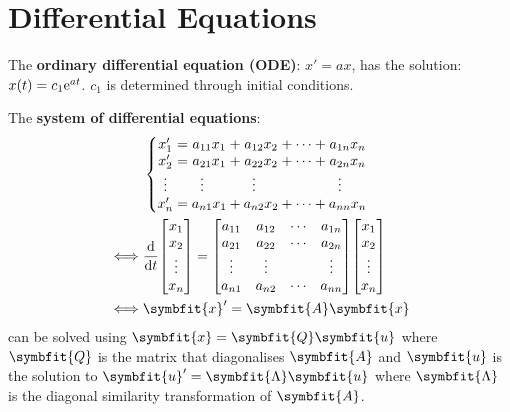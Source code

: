 \documentclass{article}
\begin{document}
\section*{Differential Equations}
The \textbf{ordinary differential equation (ODE)}: $x' = a x$,
has the solution: $x(t) = c_1 \mathrm{e}^{a t}$. $c_1$ is determined through
initial conditions.
\begin{multicols*}{2}
    The \textbf{system of differential equations}:
    \begin{align*}
               & \left\{
        \setlength\arraycolsep{0pt}
        \begin{array}{ c >{{}}c<{{}} c >{{}}c<{{}} c >{{}}c<{{}} c >{{}}c<{{}} c  }
            x'_1               & = & a_{11}x_1                         & + & a_{12}x_2                         & + & \cdots & + & a_{1n}x_n                         \\
            x'_2               & = & a_{21}x_1                         & + & a_{22}x_2                         & + & \cdots & + & a_{2n}x_n                         \\
            \vdotswithin{x'_3} &   & \vdotswithin{a_{31}}\phantom{x_1} &   & \vdotswithin{a_{32}}\phantom{x_2} &   &        &   & \vdotswithin{a_{3n}}\phantom{x_n} \\
            x'_n               & = & a_{n1}x_1                         & + & a_{n2}x_2                         & + & \cdots & + & a_{nn}x_n
        \end{array}
        \right.                                                           \\
        \iff
               & \dv{t}\mqty[x_1                                          \\ x_2 \\ \vdots \\ x_n] = \mqty[
        a_{11} & a_{12}                                 & \cdots & a_{1n} \\
        a_{21} & a_{22}                                 & \cdots & a_{2n} \\
        \vdots & \vdots                                 &        & \vdots \\
        a_{n1} & a_{n2}                                 & \cdots & a_{nn}
        ] \mqty[x_1                                                       \\ x_2 \\ \vdots \\ x_n] \\
        \iff   & \symbfit{x}' = \symbfit{A} \symbfit{x}
    \end{align*}
    can be solved using $\symbfit{x}=\symbfit{Q}\symbfit{u}$ where
    $\symbfit{Q}$ is the matrix that diagonalises $\symbfit{A}$ and
    $\symbfit{u}$ is the solution to $\symbfit{u}' = \symbfit{\Lambda} \symbfit{u}$ where
    $\symbfit{\Lambda}$ is the diagonal similarity transformation of $\symbfit{A}$.


\end{multicols*}
\end{document}
